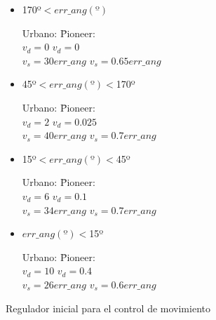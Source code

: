 \begin{table} \label{vel1}
\begin{itemize}

  \item 170º$<err\_ang(º)$

%
%

        \begin{tabbing}
        Urbano: \hspace{4cm} \=Pioneer:\\
        $v_{d}=0$ \> $v_{d}=0$\\
        $v_{s}=30err\_ang$ \> $v_{s}=0.65err\_ang$
        \end{tabbing}


  \item 45º$<err\_ang(º)<$170º

        \begin{tabbing}
        Urbano: \hspace{4cm} \=Pioneer:\\
        $v_{d}=2$ \> $v_{d}=0.025$\\
        $v_{s}=40err\_ang$ \> $v_{s}=0.7err\_ang$
        \end{tabbing}

  \item 15º$<err\_ang(º)<$45º

        \begin{tabbing}
        Urbano: \hspace{4cm} \=Pioneer:\\
        $v_{d}=6$ \> $v_{d}=0.1$\\
        $v_{s}=34err\_ang$ \> $v_{s}=0.7err\_ang$
        \end{tabbing}

  \item $err\_ang(º)<$15º

        \begin{tabbing}
        Urbano: \hspace{4cm} \=Pioneer:\\
        $v_{d}=10$ \> $v_{d}=0.4$\\
        $v_{s}=26err\_ang$ \> $v_{s}=0.6err\_ang$
        \end{tabbing}
\end{itemize}

\caption{Regulador inicial para el control de movimiento}
\end{table}

